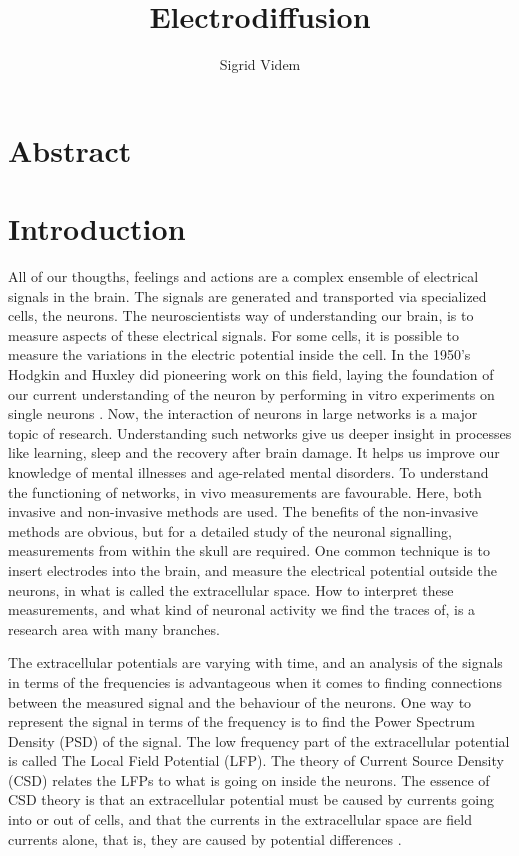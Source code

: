 \documentclass{article}
\author{Sigrid Videm}
\title{Electrodiffusion}
\begin{document}
\maketitle


\section{Abstract} 
\tableofcontents %


\section{Introduction}\label{Introduction}
All of our thougths, feelings and actions are a complex ensemble of electrical signals in the brain. The signals are generated and transported via specialized cells, the neurons. The neuroscientists way of understanding our brain, is to measure aspects of these electrical signals. For some cells, it is possible to measure the variations in the electric potential inside the cell. In the 1950's Hodgkin and Huxley did pioneering work on this field, laying the foundation of our current understanding of the neuron by performing in vitro experiments on single neurons \cite{Principle Computational Modelling in Neuroscience}. Now, the interaction of neurons in large networks is a major topic of research. Understanding such networks give us deeper insight in processes like learning, sleep and the recovery after brain damage. It helps us improve our knowledge of mental illnesses and age-related mental disorders. To understand the functioning of networks, in vivo measurements are favourable. Here, both invasive and non-invasive methods are used. The benefits of the non-invasive methods are obvious, but for a detailed study of the neuronal signalling, measurements from within the skull are required.  One common technique is to insert electrodes into the brain, and measure the electrical potential outside the neurons, in what is called the extracellular space. How to interpret these measurements, and what kind of neuronal activity we find the traces of, is a research area with many branches. 

The extracellular potentials are varying with time, and an analysis of the signals in terms of the frequencies is advantageous when it comes to finding connections between the measured signal and the behaviour of the neurons. One way to represent the signal in terms of the frequency is to find the Power Spectrum Density (PSD) of the signal. The low frequency part of the extracellular potential is called  The Local Field Potential (LFP). The theory of Current Source Density (CSD) relates the LFPs to what is going on inside the neurons. The essence of CSD theory is that an extracellular potential must be caused by currents going into or out of cells, and that the currents in the extracellular space are field currents alone, that is, they are caused by potential differences \cite{Gratiy2017}. 
\end{document}
